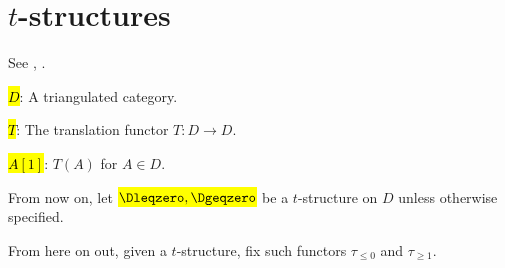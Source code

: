 \section{\texorpdfstring{$t$-structures}{t-structures}}

See \cite[1.3]{beilinson_berstein_deligne_atlesI}, \cite[II.2-4, III.1]{kiehl_weissauer_wcps}.

\hl{$D$}: A triangulated category.

\hl{$T$}: The translation functor $T: D \to D$.

\hl{$A[1]$}: $T(A)$ for $A \in D$. 




\TODO{}
From now on, let \hl{$\Dleqzero, \Dgeqzero$} be a $t$-structure on $D$ unless otherwise specified.









From here on out, given a $t$-structure, fix such functors $\tau_{\leq 0}$ and $\tau_{\geq 1}$. 




% 





